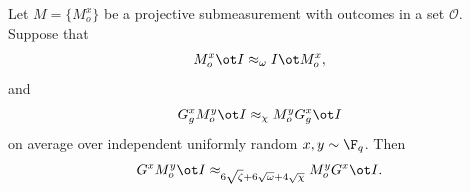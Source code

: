 \begin{lemma}\label{lem:commutativity-switcheroo}
	\leanok
	Let $M=\{M_o^x\}$ be a projective submeasurement with outcomes in a set $\mathcal O$. Suppose that
	\begin{equation}\label{eq:M-self-consistent}
		M_o^x \ot I \approx_\omega I \ot M_o^x,
	\end{equation}
	and
	\begin{equation}\label{eq:M-commutes-with-G}
		G_g^x M_o^y \ot I \approx_\chi M_o^y G_g^x \ot I
	\end{equation}
	on average over independent uniformly random $x,y \sim \F_q$. Then
	\[
		G^x M_o^y \ot I \approx_{6\sqrt{\zeta}+6\sqrt{\omega}+4\sqrt{\chi}} M_o^y G^x \ot I.
	\]
\end{lemma}
